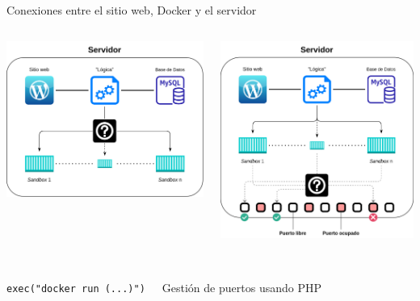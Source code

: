     \begin{frame}{Conexiones entre el sitio web, Docker y el servidor}
        \begin{columns}[c]
                \includegraphics[scale=0.1]{images/diagramas/conexion.png}
            
                \includegraphics[scale=0.1]{images/diagramas/puertos.png}
        \end{columns}

        \begin{columns}[c]
                \\
                \texttt{exec("docker run (...)")}
            
                \\
                Gestión de puertos usando PHP
        \end{columns}
    \end{frame}

